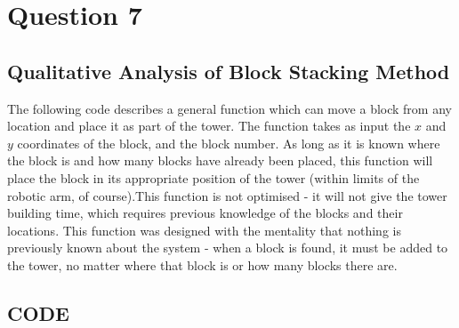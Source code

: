 \section{Question 7}
	\subsection{Qualitative Analysis of Block Stacking Method}
	The following code describes a general function which can move a block from any location and place it as part of the tower. The function takes as input the $ x $ and $ y $ coordinates of the block, and the block number. As long as it is known where the block is and how many blocks have already been placed, this function will place the block in its appropriate position of the tower (within limits of the robotic arm, of course).\newline This function is not optimised - it will not give the tower building time, which requires previous knowledge of the blocks and their locations. This function was designed with the mentality that nothing is previously known about the system - when a block is found, it must be added to the tower, no matter where that block is or how many blocks there are.\newline
	\subsection{CODE}
	